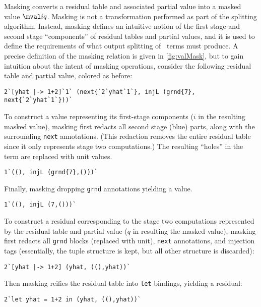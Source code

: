 \begin{abstrsyn}
Masking converts a residual table and associated partial value into a
masked value $\mval i q$.
Masking is not a transformation performed as part of the splitting
algorithm.  Instead, masking defines an intuitive notion of the first
stage and second stage ``components'' of residual tables and partial
values, and it is used to define the requirements of what output
splitting of \bbonem\ terms must produce.  A precise definition of the
masking relation is given in \ref{fig:valMask}, but to gain intuition
about the intent of masking operations, consider the following
residual table and partial value, colored as before:
\begin{lstlisting}
2`[yhat |-> 1+2]`1` (next{`2`yhat`1`}, injL (grnd{7}, next{`2`yhat`1`}))`
\end{lstlisting}
To construct a value representing its first-stage components ($i$ in
the resulting masked value), masking first redacts all second stage
(blue) parts, along with the surrounding \texttt{next}
annotations. (This redaction removes the entire residual table since
it only represents stage two computations.) The resulting ``holes'' in
the term are replaced with unit values.
\begin{lstlisting}
1`((), injL (grnd{7},()))`
\end{lstlisting}
Finally, masking dropping \texttt{grnd} annotations yielding a value.
\begin{lstlisting}
1`((), injL (7,()))`
\end{lstlisting}
To construct a residual corresponding to the stage two computations
represented by the residual table and partial value ($q$ in resulting
the masked value), masking first redacts all \texttt{grnd} blocks
(replaced with unit), \texttt{next} annotations, and injection tags
(essentially, the tuple structure is kept, but all other structure is
discarded):
\begin{lstlisting}
2`[yhat |-> 1+2] (yhat, ((),yhat))`
\end{lstlisting}
Then masking reifies the residual table into \texttt{let} bindings,
yielding a residual:
\begin{lstlisting}
2`let yhat = 1+2 in (yhat, ((),yhat))`
\end{lstlisting}


\end{abstrsyn}
